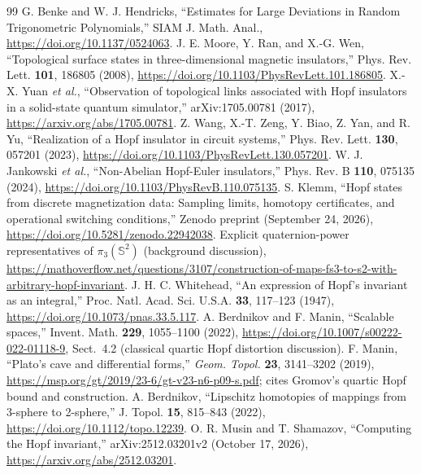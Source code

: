 \documentclass[aps,prd,onecolumn,notitlepage,11pt,superscriptaddress,longbibliography]{revtex4-2}
\newcommand{\Sph}{\mathbb S}
\begin{document}
\begin{thebibliography}{99}
 G. Benke and W. J. Hendricks, ``Estimates for Large Deviations in Random Trigonometric Polynomials,'' SIAM J. Math. Anal., \url{https://doi.org/10.1137/0524063}.
 J. E. Moore, Y. Ran, and X.-G. Wen, ``Topological surface states in three-dimensional magnetic insulators,'' Phys. Rev. Lett. \textbf{101}, 186805 (2008), \url{https://doi.org/10.1103/PhysRevLett.101.186805}.
 X.-X. Yuan \emph{et al.}, ``Observation of topological links associated with Hopf insulators in a solid-state quantum simulator,'' arXiv:1705.00781 (2017), \url{https://arxiv.org/abs/1705.00781}.
 Z. Wang, X.-T. Zeng, Y. Biao, Z. Yan, and R. Yu, ``Realization of a Hopf insulator in circuit systems,'' Phys. Rev. Lett. \textbf{130}, 057201 (2023), \url{https://doi.org/10.1103/PhysRevLett.130.057201}.
 W. J. Jankowski \emph{et al.}, ``Non-Abelian Hopf-Euler insulators,'' Phys. Rev. B \textbf{110}, 075135 (2024), \url{https://doi.org/10.1103/PhysRevB.110.075135}.
 S. Klemm, ``Hopf states from discrete magnetization data: Sampling limits, homotopy certificates, and operational switching conditions,'' Zenodo preprint (September 24, 2026), \url{https://doi.org/10.5281/zenodo.22942038}.
 Explicit quaternion-power representatives of $\pi_3(\Sph^2)$ (background discussion), \url{https://mathoverflow.net/questions/3107/construction-of-maps-fs3-to-s2-with-arbitrary-hopf-invariant}.
 J. H. C. Whitehead, ``An expression of Hopf's invariant as an integral,'' Proc. Natl. Acad. Sci. U.S.A. \textbf{33}, 117--123 (1947), \url{https://doi.org/10.1073/pnas.33.5.117}.
 A. Berdnikov and F. Manin, ``Scalable spaces,'' Invent. Math. \textbf{229}, 1055--1100 (2022), \url{https://doi.org/10.1007/s00222-022-01118-9}, Sect.~4.2 (classical quartic Hopf distortion discussion).
 F. Manin, ``Plato's cave and differential forms,'' \emph{Geom. Topol.} \textbf{23}, 3141--3202 (2019), \url{https://msp.org/gt/2019/23-6/gt-v23-n6-p09-s.pdf}; cites Gromov's quartic Hopf bound and construction.
 A. Berdnikov, ``Lipschitz homotopies of mappings from 3-sphere to 2-sphere,'' J. Topol. \textbf{15}, 815--843 (2022), \url{https://doi.org/10.1112/topo.12239}.
 O. R. Musin and T. Shamazov, ``Computing the Hopf invariant,'' arXiv:2512.03201v2 (October 17, 2026), \url{https://arxiv.org/abs/2512.03201}.

\end{thebibliography}
\end{document}
